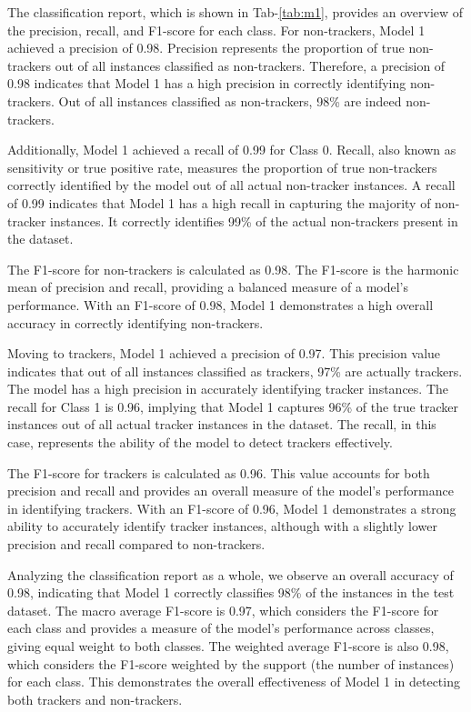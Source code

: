The classification report, which is shown in Tab-\ref{tab:m1}, provides an overview of the precision, recall, and F1-score for each class.
For non-trackers, Model 1 achieved a precision of 0.98. Precision represents the proportion of true non-trackers
out of all instances classified as non-trackers. Therefore, a precision of 0.98 indicates that Model 1 has a high precision
in correctly identifying non-trackers. Out of all instances classified as non-trackers, 98\% are indeed non-trackers.

Additionally, Model 1 achieved a recall of 0.99 for Class 0. Recall, also known as sensitivity or true positive rate, measures
the proportion of true non-trackers correctly identified by the model out of all actual non-tracker instances. A recall of 0.99
indicates that Model 1 has a high recall in capturing the majority of non-tracker instances. It correctly identifies 99\% of the
actual non-trackers present in the dataset.

The F1-score for non-trackers is calculated as 0.98. The F1-score is the harmonic mean of precision and recall, providing a balanced
measure of a model's performance. With an F1-score of 0.98, Model 1 demonstrates a high overall accuracy in correctly identifying
non-trackers.

Moving to trackers, Model 1 achieved a precision of 0.97. This precision value indicates that out of all instances
classified as trackers, 97\% are actually trackers. The model has a high precision in accurately identifying tracker instances.
The recall for Class 1 is 0.96, implying that Model 1 captures 96\% of the true tracker instances out of all actual tracker
instances in the dataset. The recall, in this case, represents the ability of the model to detect trackers effectively.

The F1-score for trackers is calculated as 0.96. This value accounts for both precision and recall and provides an overall
measure of the model's performance in identifying trackers. With an F1-score of 0.96, Model 1 demonstrates a strong ability
to accurately identify tracker instances, although with a slightly lower precision and recall compared to non-trackers.

Analyzing the classification report as a whole, we observe an overall accuracy of 0.98, indicating that Model 1 correctly
classifies 98\% of the instances in the test dataset. The macro average F1-score is 0.97, which considers the F1-score
for each class and provides a measure of the model's performance across classes, giving equal weight to both classes.
The weighted average F1-score is also 0.98, which considers the F1-score weighted by the support (the number of instances)
for each class. This demonstrates the overall effectiveness of Model 1 in detecting both trackers and non-trackers.

